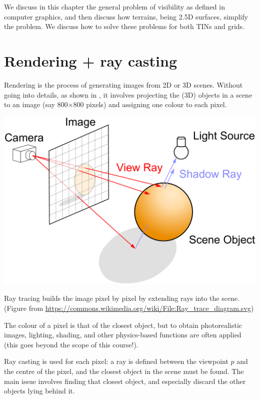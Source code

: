 %

We discuss in this chapter the general problem of visibility as defined in computer graphics, and then discuss how terrains, being 2.5D surfaces, simplify the problem.
We discuss how to solve these problems for both TINs and grids.


%
\section{Rendering + ray casting}

Rendering is the process of generating images from 2D or 3D scenes.
Without going into details, as shown in , it involves projecting the (3D) objects in a scene to an image (say 800$\times$800 pixels) and assigning one colour to each pixel.
\begin{marginfigure}
  \centering
  \includegraphics[width=\linewidth]{figs/Ray_trace_diagram.pdf}
  \caption{Ray tracing builds the image pixel by pixel by extending rays into the scene. (Figure from \url{https://commons.wikimedia.org/wiki/File:Ray_trace_diagram.svg})}%
\end{marginfigure}
The colour of a pixel is that of the closest object, but to obtain photorealistic images, lighting, shading, and other physics-based functions are often applied (this goes beyond the scope of this course!).

Ray casting is used for each pixel: a ray is defined between the viewpoint $p$ and the centre of the pixel, and the closest object in the scene must be found.
The main issue involves finding that closest object, and especially discard the other objects lying behind it.


